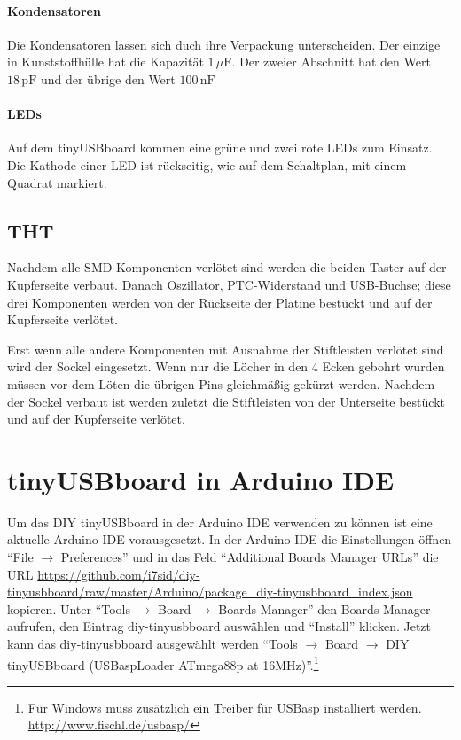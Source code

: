 \paragraph*{Kondensatoren}
Die Kondensatoren lassen sich duch ihre Verpackung unterscheiden. Der einzige in Kunststoffhülle hat die Kapazität $1\,\mu \mathrm{F}$. Der zweier Abschnitt hat den Wert $18\,\mathrm{pF}$ und der übrige den Wert $100\, \mathrm{nF}$
\paragraph*{LEDs}
Auf dem tinyUSBboard kommen eine grüne und zwei rote LEDs zum Einsatz.
\newpage
Die Kathode einer LED ist rückseitig, wie auf dem Schaltplan, mit einem Quadrat markiert.

\subsection{THT}
Nachdem alle SMD Komponenten verlötet sind werden die beiden Taster auf der Kupferseite verbaut.
Danach Oszillator, PTC-Widerstand und USB-Buchse; diese drei Komponenten werden von der Rückseite der Platine bestückt und auf der Kupferseite verlötet.

Erst wenn alle andere Komponenten mit Ausnahme der Stiftleisten verlötet sind wird der Sockel eingesetzt. Wenn nur die Löcher in den 4 Ecken gebohrt wurden müssen vor dem Löten die übrigen Pins gleichmäßig gekürzt werden.
Nachdem der Sockel verbaut ist werden zuletzt die Stiftleisten von der Unterseite bestückt und auf der Kupferseite verlötet.


\section{tinyUSBboard in Arduino IDE}
Um das DIY tinyUSBboard in der Arduino IDE verwenden zu können ist eine aktuelle Arduino IDE vorausgesetzt. In der Arduino IDE die Einstellungen öffnen \enquote{File $\rightarrow$ Preferences} und in das Feld \enquote{Additional Boards Manager URLs} die URL \url{https://github.com/i7sid/diy-tinyusbboard/raw/master/Arduino/package_diy-tinyusbboard_index.json} kopieren. Unter \enquote{Tools $\rightarrow$ Board $\rightarrow$ Boards Manager} den Boards Manager aufrufen, den Eintrag diy-tinyusbboard auswählen und \enquote{Install} klicken. Jetzt kann das diy-tinyusbboard ausgewählt werden \enquote{Tools $\rightarrow$ Board $\rightarrow$ DIY tinyUSBboard (USBaspLoader ATmega88p at 16MHz)}.\footnote{Für Windows muss zusätzlich ein Treiber für USBasp installiert werden. \url{http://www.fischl.de/usbasp/}}
